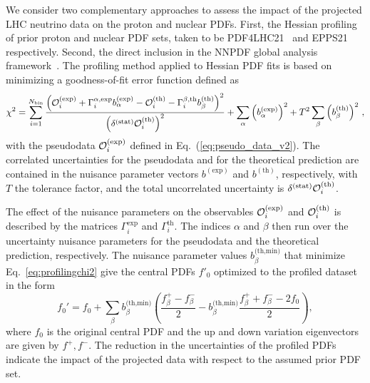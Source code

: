 We consider two complementary approaches to assess the
impact of the projected LHC neutrino data on the proton and nuclear PDFs.
%
First, the Hessian profiling\cite{Paukkunen:2014zia, Schmidt:2018hvu, AbdulKhalek:2018rok, HERAFitterdevelopersTeam:2015cre} of prior proton and
nuclear PDF sets, taken to be PDF4LHC21~\cite{PDF4LHCWorkingGroup:2022cjn} and
EPPS21~\cite{Eskola:2021nhw} respectively.
%
Second, the direct inclusion 
in the NNPDF global analysis framework~\cite{NNPDF:2021uiq,NNPDF:2021njg}.
%
The profiling method applied to Hessian PDF fits is based
on minimizing a goodness-of-fit error function defined as
\begin{equation}
\chi^2 = 
\sum_{i=1}^{N_{\textrm{bin}}} 
{{\left(  \mathcal{O}_i^{\rm (exp)}
            + \Gamma_i^{\alpha,\textrm{exp}}
              b_\alpha^{\textrm{(exp)}}
            - \mathcal{O}_i^{\rm (th)}
            - \Gamma_i^{\beta,\textrm{th}}
              b_\beta^{(\textrm{th})}
     \right)^2
     }\over { \left(\delta^{{\rm (stat)}}\mathcal{O}_i^{\rm (th)}\right)^2 }}
+ \sum_\alpha \left( b_\alpha^{(\textrm{exp})}\right)^2
+ T^2 \sum_\beta  \left( b_\beta^{\textrm{(th)}}\right) ^2 \, ,
\label{eq:profilingchi2}
\end{equation}
with the pseudodata 
$\mathcal{O}_i^{\rm (exp)}$ defined in  Eq.~(\ref{eq:pseudo_data_v2}).
%
The correlated uncertainties for the pseudodata and for the theoretical prediction 
are contained in the nuisance parameter vectors $b^{(\textrm{exp})}$ and $b^{(\textrm{th})}$, respectively, with $T$ the tolerance factor, and the total uncorrelated uncertainty is $\delta^{{\rm (stat)}}\mathcal{O}_i^{\rm (th)}$.

The effect of the nuisance parameters
on the observables $\mathcal{O}_i^{\rm (exp)}$ and $\mathcal{O}_i^{\rm (th)}$
is described by the matrices $\Gamma_i^{\textrm{exp}}$ and $\Gamma_i^{\textrm{th}}$.
%
The indices $\alpha$ and $\beta$ then run over the uncertainty nuisance parameters for the pseudodata and the theoretical prediction, respectively.
%
The nuisance parameter values $b_\beta^{\textrm{(th,min)}}$ that minimize Eq.~\eqref{eq:profilingchi2} give the central PDFs $f'_0$ optimized to the profiled dataset in the form
\begin{equation}
f_0' = f_0
      + \sum_\beta b_\beta^{\textrm{(th,min)}} 
        \left(  \frac{f_\beta^+   -  f_\beta^- }{2}
              -    b_\beta^{\textrm{(th,min)}}
                \frac{f_\beta^+ + f_\beta^- - 2f_0}{2}
        \right),
\end{equation}
where $f_0$ is the original central PDF and the up and down variation eigenvectors are given by $f^+, f^-$.
%
The reduction in the uncertainties of the profiled PDFs indicate the impact
of the projected data with respect to the assumed prior PDF set.

